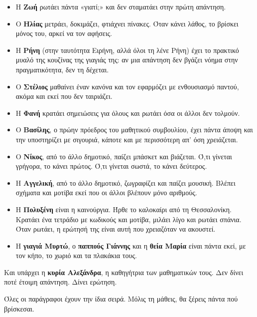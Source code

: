 \begin{itemize}[leftmargin=1.4em,itemsep=0.2ex]
\item Η \textbf{Ζωή} ρωτάει πάντα «γιατί;» και δεν σταματάει στην πρώτη απάντηση.
\item Ο \textbf{Ηλίας} μετράει, δοκιμάζει, φτιάχνει πίνακες. Όταν κάνει λάθος, το βρίσκει μόνος του, αρκεί να τον αφήσεις.
\item Η \textbf{Ρήνη} (στην ταυτότητα Ειρήνη, αλλά όλοι τη λένε Ρήνη) έχει το πρακτικό μυαλό της κουζίνας της γιαγιάς της: αν μια απάντηση δεν βγάζει νόημα στην πραγματικότητα, δεν τη δέχεται.
\item Ο \textbf{Στέλιος} μαθαίνει έναν κανόνα και τον εφαρμόζει με ενθουσιασμό παντού, ακόμα και εκεί που δεν ταιριάζει.
\item Η \textbf{Φανή} κρατάει σημειώσεις για όλους και ρωτάει όσα οι άλλοι δεν τολμούν.
\item Ο \textbf{Βασίλης}, ο πρώην πρόεδρος του μαθητικού συμβουλίου, έχει πάντα άποψη και την υποστηρίζει με σιγουριά, κάποτε και με περισσότερη απ' όση χρειάζεται.
\item Ο \textbf{Νίκος}, από το άλλο δημοτικό, παίζει μπάσκετ και βιάζεται. Ό,τι γίνεται γρήγορα, το κάνει πρώτος. Ό,τι γίνεται σωστά, το κάνει δεύτερος.
\item Η \textbf{Αγγελική}, από το άλλο δημοτικό, ζωγραφίζει και παίζει μουσική. Βλέπει σχήματα και μοτίβα εκεί που οι άλλοι βλέπουν μόνο αριθμούς.
\item Η \textbf{Πολυξένη} είναι η καινούργια. Ήρθε το καλοκαίρι από τη Θεσσαλονίκη. Κρατάει ένα τετράδιο με κωδικούς και μοτίβα, μιλάει λίγο και ρωτάει σπάνια. Όταν ρωτάει, η ερώτησή της είναι αυτή που χρειαζόταν να ακουστεί.
\item Η \textbf{γιαγιά Μυρτώ}, ο \textbf{παππούς Γιάννης} και η \textbf{θεία Μαρία} είναι πάντα εκεί, με τον κήπο, το χωριό και τα πλακάκια τους.
\end{itemize}

Και υπάρχει η \textbf{κυρία Αλεξάνδρα}, η καθηγήτρια των μαθηματικών τους. Δεν δίνει ποτέ έτοιμη απάντηση. Δίνει ερώτηση.

\clearpage
{}

Όλες οι παράγραφοι έχουν την ίδια σειρά. Μόλις τη μάθεις, θα ξέρεις πάντα πού βρίσκεσαι.

